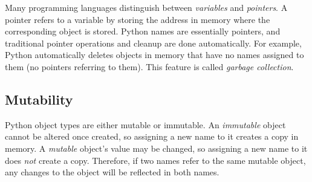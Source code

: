 \begin{info}
Many programming languages distinguish between \emph{variables} and \emph{pointers}.
A pointer refers to a variable by storing the address in memory where the corresponding object is stored.
Python names are essentially pointers, and traditional pointer operations and cleanup are done automatically.
For example, Python automatically deletes objects in memory that have no names assigned to them (no pointers referring to them).
This feature is called \emph{garbage collection}.
\end{info}

\subsection*{Mutability} %

Python object types are either mutable or immutable.
An \emph{immutable} object cannot be altered once created, so assigning a new name to it creates a copy in memory.
A \emph{mutable} object's value may be changed, so assigning a new name to it does \emph{not} create a copy.
Therefore, if two names refer to the same mutable object, any changes to the object will be reflected in both names.

